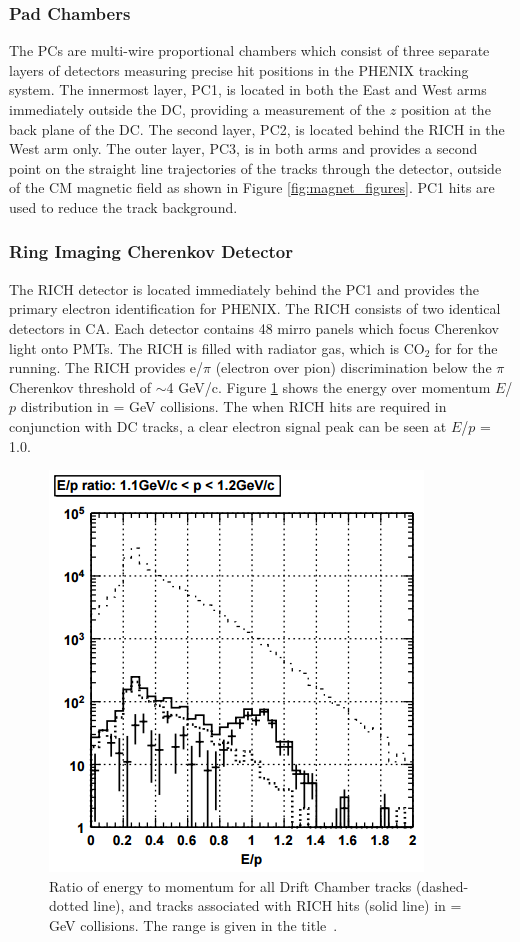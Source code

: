 \subsubsection{Pad Chambers}
The PCs are multi-wire proportional chambers which consist of three separate layers of detectors measuring precise hit positions in the PHENIX tracking system. The innermost layer, PC1, is located in both the East and West arms immediately outside the DC, providing a measurement of the $z$ position at the back plane of the DC. The second layer, PC2, is located behind the RICH in the West arm only. The outer layer, PC3, is in both arms and provides a second point on the straight line trajectories of the tracks through the detector, outside of the CM magnetic field as shown in Figure \ref{fig:magnet_figures}. PC1 hits are used to reduce the track background.

\subsubsection{Ring Imaging Cherenkov Detector}
The RICH detector is located immediately behind the PC1 and provides the primary electron identification for PHENIX. The RICH consists of two identical detectors in CA. Each detector contains 48 mirro panels which focus Cherenkov light onto PMTs. The RICH is filled with radiator gas, which is CO$_2$ for for the \pau running. The RICH provides e/$\pi$ (electron over pion) discrimination below the $\pi$ Cherenkov threshold of $\sim$4 GeV/c. Figure \ref{fig:rich_discrim_ep} shows the energy over momentum $E$/$p$ distribution in \auau =  GeV collisions. The when RICH hits are required in conjunction with DC tracks, a clear electron signal peak can be seen at $E$/$p$ = 1.0.

\begin{figure}[!h]
\begin{center}
\includegraphics[width=0.55\linewidth]{figs/e_over_p_rich_discrimination.png}
\caption{Ratio of energy to momentum for all Drift Chamber tracks (dashed-dotted line), and tracks associated with RICH hits (solid line) in \auau =  GeV collisions. The \pt range is given in the title~\cite{Aizawa2003508}.}
\label{fig:rich_discrim_ep}
\end{center}
\end{figure}
